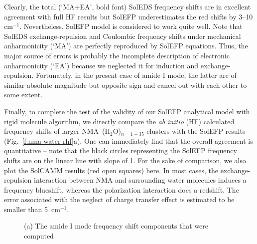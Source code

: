 \documentclass[a4paper,titlepage,twoside,fleqn,12pt]{book}
\begin{document}
\begin{refsection}
Clearly, the total (`MA+EA', bold font) SolEDS frequency shifts 
are in excellent agreement with full HF results
but SolEFP underestimates the red shifts by 3--10 cm$^{-1}$.
Nevertheless, 
SolEFP model is considered to work quite well. Note that 
SolEDS exchange\hyp{}repulsion
and Coulombic frequency shifts under mechanical anharmonicity (`MA')
are perfectly reproduced by SolEFP equations. Thus, the major source of errors
is probably the incomplete description of electronic anharmonicity (`EA')
because we neglected it for induction and exchange\hyp{}repulsion.
Fortunately, in the present case of amide I mode, the latter are
of similar absolute magnitude but opposite sign and cancel out with
each other to some extent.

Finally, to complete the test of the validity of our SolEFP
analytical model with rigid molecule algorithm, we directly
compare the \emph{ab initio} (HF) calculated frequency shifts of
larger NMA--(H$_2$O)$_{n = 1-35}$ clusters with the SolEFP results
(Fig.~\ref{f:nma-water-rhf}a). One can immediately find that the overall
agreement is quantitative -- note that the black circles representing
the SolEFP frequency shifts are on the linear line with
slope of 1. For the sake of comparison, we also plot the SolCAMM 
results (red open squares) here. In most cases, the
exchange\hyp{}repulsion interaction between NMA and surrounding
water molecules induces a frequency blueshift, whereas
the polarization interaction does a redshift. The error associated
with the neglect of charge transfer effect is estimated to
be smaller than 5~cm$^{-1}$.
%
\begin{figure}[t!]
\centering
\setlength\fboxsep{0.4pt}
\setlength\fboxrule{0.5pt}
\caption{
(a) The amide I mode frequency shift components that were computed
}
\end{figure}
\end{refsection}
\end{document}
